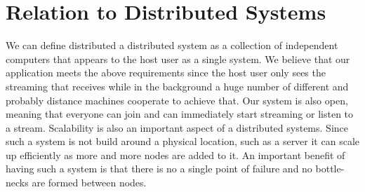 \section{Relation to Distributed Systems}
\label{rtds}

We can define distributed a distributed system as a collection of independent computers that appears to the host user as a single system. We believe that our application meets the above requirements since the host user only sees the streaming that receives while in the background a huge number of different and probably distance machines cooperate to achieve that. Our system is also open, meaning that everyone can join and can immediately start streaming or listen to a stream. Scalability is also an important aspect of a distributed systems. Since such a system is not build around a physical location, such as a server it can scale up efficiently as more and more nodes are added to it. An important benefit of having such a system is that there is no a single point of failure and no bottle-necks are formed between nodes. \\


